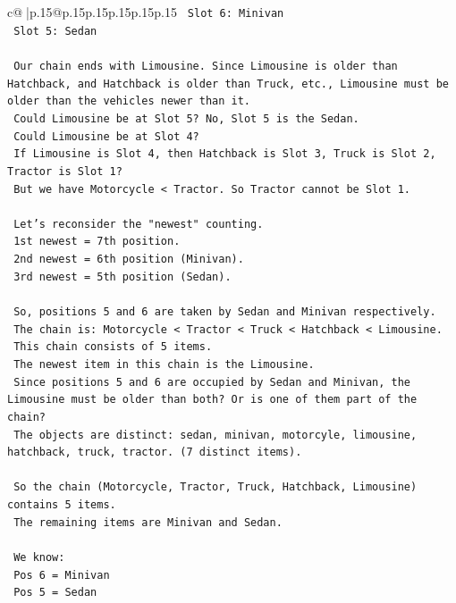 \documentclass{article}
\begin{document}
{\begin{supertabular}{c@{$\;$}|p{.15\linewidth}@{}p{.15\linewidth}p{.15\linewidth}p{.15\linewidth}p{.15\linewidth}p{.15\linewidth}}
{{{\texttt{    Slot 6: Minivan} \\
\texttt{    Slot 5: Sedan} \\
\\ 
\texttt{    Our chain ends with Limousine. Since Limousine is older than Hatchback, and Hatchback is older than Truck, etc., Limousine must be older than the vehicles newer than it.} \\
\texttt{    Could Limousine be at Slot 5? No, Slot 5 is the Sedan.} \\
\texttt{    Could Limousine be at Slot 4?} \\
\texttt{    If Limousine is Slot 4, then Hatchback is Slot 3, Truck is Slot 2, Tractor is Slot 1?} \\
\texttt{    But we have Motorcycle < Tractor. So Tractor cannot be Slot 1.} \\
\\ 
\texttt{    Let's reconsider the "newest" counting.} \\
\texttt{    1st newest = 7th position.} \\
\texttt{    2nd newest = 6th position (Minivan).} \\
\texttt{    3rd newest = 5th position (Sedan).} \\
\\ 
\texttt{    So, positions 5 and 6 are taken by Sedan and Minivan respectively.} \\
\texttt{    The chain is: Motorcycle < Tractor < Truck < Hatchback < Limousine.} \\
\texttt{    This chain consists of 5 items.} \\
\texttt{    The newest item in this chain is the Limousine.} \\
\texttt{    Since positions 5 and 6 are occupied by Sedan and Minivan, the Limousine must be older than both? Or is one of them part of the chain?} \\
\texttt{    The objects are distinct: sedan, minivan, motorcyle, limousine, hatchback, truck, tractor. (7 distinct items).} \\
\\ 
\texttt{    So the chain (Motorcycle, Tractor, Truck, Hatchback, Limousine) contains 5 items.} \\
\texttt{    The remaining items are Minivan and Sedan.} \\
\\ 
\texttt{    We know:} \\
\texttt{    Pos 6 = Minivan} \\
\texttt{    Pos 5 = Sedan} \\
}}}
\end{supertabular}}
\end{document}
